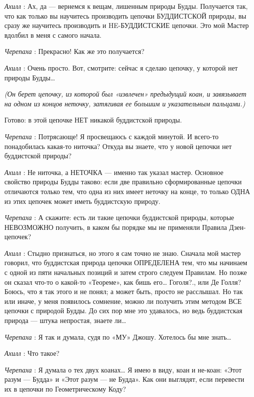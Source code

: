 \emph{Ахилл} : Ах, да --- вернемся к вещам, лишенным природы Будды. Получается так, что как только вы научитесь производить цепочки БУДДИСТСКОЙ природы, вы сразу же научитесь производить и HE-БУДДИСТСКИЕ цепочки. Это мой Мастер вдолбил в меня с самого начала.

\emph{Черепаха} : Прекрасно! Как же это получается?

\emph{Ахилл} : Очень просто. Вот, смотрите: сейчас я сделаю цепочку, у которой нет природы Будды\ldots{}

\emph{(Он берет цепочку, из которой был «извлечен» предыдущий коан, и завязывает на одном из концов неточку, затягивая ее большим и указательным пальцами.)}

Готово: в этой цепочке НЕТ никакой буддистской природы.

\emph{Черепаха} : Потрясающе! Я просвещаюсь с каждой минутой. И всего-то понадобилась какая-то ниточка? Откуда вы знаете, что у новой цепочки нет буддистской природы?

\emph{Ахилл} : Не ниточка, а НЕТОЧКА --- именно так указал мастер. Основное свойство природы Будды таково: если две правильно сформированные цепочки отличаются только тем, что одна из них имеет неточку на конце, то только ОДНА из этих цепочек может иметь буддистскую природу.

\emph{Черепаха} : А скажите: есть ли такие цепочки буддистской природы, которые НЕВОЗМОЖНО получить, в каком бы порядке мы не применяли Правила Дзен-цепочек?

\emph{Ахилл} : Стыдно признаться, но этого я сам точно не знаю. Сначала мой мастер говорил, что буддистская природа цепочки ОПРЕДЕЛЕНА тем, что мы начинаем с одной из пяти начальных позиций и затем строго следуем Правилам. Но позже он сказал что-то о какой-то «Теореме», как бишь его\ldots{} Гоголя?., или Де Голля? Боюсь, что я так этого и не понял; а может быть, просто не расслышал. Но так или иначе, у меня появилось сомнение, можно ли получить этим методом ВСЕ цепочки с природой Будды. До сих пор мне это удавалось, но ведь буддистская природа --- штука непростая, знаете ли\ldots{}

\emph{Черепаха} : Я так и думала, судя по «МУ» Джошу. Хотелось бы мне знать\ldots{}

\emph{Ахилл} : Что такое?

\emph{Черепаха} : Я думала о тех двух коанах\ldots{} Я имею в виду, коан и не-коан: «Этот разум --- Будда» и «Этот разум --- не Будда». Как они выглядят, если перевести их в цепочки по Геометрическому Коду?

